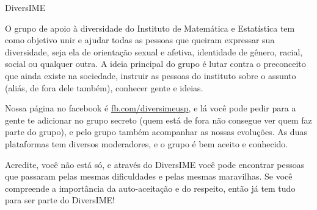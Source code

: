\begin{subsecao}{DiversIME}


O grupo de apoio à diversidade do Instituto de Matemática e Estatística tem como
objetivo unir e ajudar todas as pessoas que queiram expressar sua diversidade,
seja ela de orientação sexual e afetiva, identidade de gênero, racial, social ou
qualquer outra. A ideia principal do grupo é lutar contra o preconceito que
ainda existe na sociedade, instruir as pessoas do instituto sobre o assunto
(aliás, de fora dele também), conhecer gente e ideias.

Nossa página no facebook é \url{fb.com/diversimeusp}, e lá você pode pedir para
a gente te adicionar no grupo secreto (quem está de fora não consegue ver quem
faz parte do grupo), e pelo grupo também acompanhar as nossas evoluções. As duas
plataformas tem diversos moderadores, e o grupo é bem aceito e conhecido. 

Acredite, você não está só, e através do DiversIME você pode encontrar pessoas
que passaram pelas mesmas dificuldades e pelas mesmas maravilhas. Se você
compreende a importância da auto-aceitação e do respeito, então já tem tudo para
ser parte do DiversIME!

\end{subsecao}
